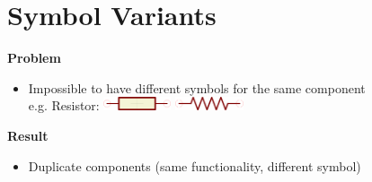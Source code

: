 \section{Symbol Variants}

\begin{frame}{\secname}
  \textbf{Problem}
  \begin{itemize}
    \item Impossible to have different symbols for the same component\\
          e.g. Resistor: \includegraphics[height=4mm]{images/R-EU_symbol.png}
          \includegraphics[height=4mm]{images/R-US_symbol.png}
  \end{itemize}

  \pause

  \textbf{Result}
  \begin{itemize}
    \item Duplicate components (same functionality, different symbol)
  \end{itemize}
\end{frame}


